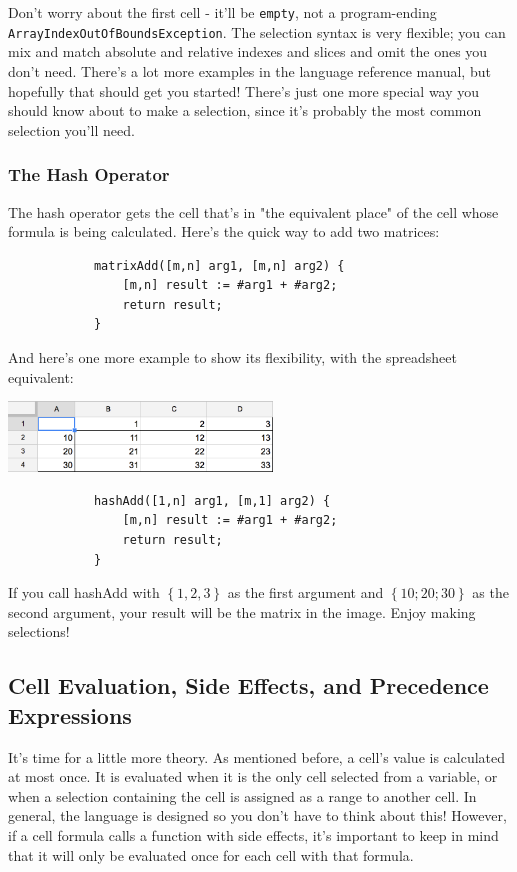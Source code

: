 		\medskip \noindent
		Don't worry about the first cell - it'll be \texttt{empty}, not a program-ending \texttt{ArrayIndexOutOfBoundsException}. The selection syntax is very flexible; you can mix and match absolute and relative indexes and slices and omit the ones you don't need. There's a lot more examples in the language reference manual, but hopefully that should get you started! There's just one more special way you should know about to make a selection, since it's probably the most common selection you'll need.

		\subsubsection{The Hash Operator}
		The hash operator gets the cell that's in "the equivalent place" of the cell whose formula is being calculated. Here's the quick way to add two matrices:
		\begin{lstlisting}
			matrixAdd([m,n] arg1, [m,n] arg2) {
				[m,n] result := #arg1 + #arg2;
				return result;
			}
		\end{lstlisting}
		\medskip \noindent
		And here's one more example to show its flexibility, with the spreadsheet equivalent:
		\begin{center}
		\includegraphics[width=7cm]{img/tutHash.png}
		\end{center}
		\begin{lstlisting}
			hashAdd([1,n] arg1, [m,1] arg2) {
				[m,n] result := #arg1 + #arg2;
				return result;
			}
		\end{lstlisting}
		\medskip \noindent
		If you call hashAdd with $\left\{1,2,3\right\}$ as the first argument and $\left\{10;20;30\right\}$ as the second argument, your result will be the matrix in the image. Enjoy making selections!

	\subsection{Cell Evaluation, Side Effects, and Precedence Expressions}
	It's time for a little more theory. As mentioned before, a cell's value is calculated at most once. It is evaluated when it is the only cell selected from a variable, or when a selection containing the cell is assigned as a range to another cell. In general, the language is designed so you don't have to think about this! However, if a cell formula calls a function with side effects, it's important to keep in mind that it will only be evaluated once for each cell with that formula.

